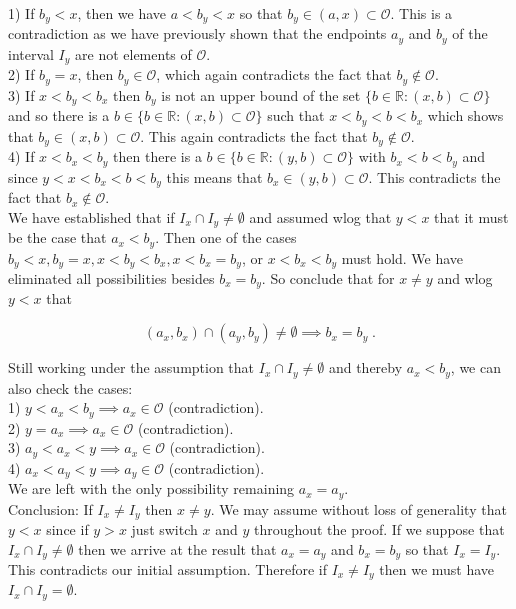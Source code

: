 \documentclass[a4paper]{article}
\begin{document}
1) If $b_y < x$, then we have $a<b_y<x$ so that $b_y \in (a,x) \subset \mathcal{O}$. This is a contradiction as we have previously shown that the endpoints $a_y$ and $b_y$ of the interval $I_y$ are not elements of $\mathcal{O}$. \\
2) If $b_y = x$, then $b_y \in \mathcal{O}$, which again contradicts the fact that $b_y \not\in \mathcal{O}$.\\
3) If $x<b_y< b_x$ then $b_y$ is not an upper bound of the set $\{b \in \mathbb{R} : (x,b) \subset \mathcal{O}\}$ and so there is a $b \in \{b \in \mathbb{R} : (x,b) \subset \mathcal{O}\}$ such that $x<b_y<b<b_x$ which shows that $b_y \in (x,b)\subset \mathcal{O}$. This again contradicts the fact that $b_y \not\in \mathcal{O}$. \\
4) If $x<b_x < b_y$ then there is a $b \in \{b \in \mathbb{R} : (y,b) \subset \mathcal{O}\}$ with $b_x < b < b_y$ and since $y<x<b_x<b<b_y$ this means that $b_x \in (y,b) \subset \mathcal{O}$. This contradicts the fact that $b_x \not\in \mathcal{O}$.\\

We have established that if $I_x \cap I_y \neq \emptyset$ and assumed wlog that $y<x$ that it must be the case that $a_x<b_y$. Then one of the cases $b_y<x, b_y = x, x<b_y<b_x, x < b_x = b_y$, or $x<b_x<b_y$ must hold. We have eliminated all possibilities besides $b_x = b_y$. So conclude that for $x\neq y$ and wlog $y<x$ that

$$ (a_x,b_x) \cap (a_y,b_y)\neq \emptyset \implies b_x = b_y\;.$$

Still working under the assumption that $I_x \cap I_y \neq \emptyset$ and thereby $a_x < b_y$, we can also check the cases:\\

1) $y<a_x<b_y \implies a_x \in \mathcal{O}$ (contradiction).\\
2) $ y = a_x \implies a_x \in \mathcal{O}$ (contradiction).\\
3) $a_y < a_x < y \implies a_x \in \mathcal{O}$ (contradiction).\\
4) $a_x<a_y<y \implies a_y \in \mathcal{O}$ (contradiction).\\

We are left with the only possibility remaining $a_x = a_y$. \\

Conclusion: If $I_x \neq I_y$ then $x\neq y$. We may assume without loss of generality that $y<x$ since if $y>x$ just switch $x$ and $y$ throughout the proof. If we suppose that $I_x\cap I_y \neq \emptyset$ then we arrive at the result that $a_x = a_y$ and $b_x = b_y$ so that $I_x = I_y$. This contradicts our initial assumption. Therefore if $I_x \neq I_y$ then we must have $I_x \cap I_y = \emptyset$. \\
\end{document}
